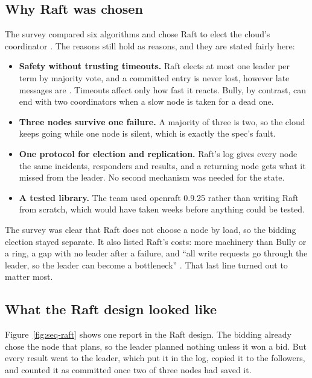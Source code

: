 \subsection{Why Raft was chosen}

The survey compared six algorithms and chose Raft to elect the cloud's coordinator \cite{survey}. The reasons still hold as reasons, and they are stated fairly here:

\begin{itemize}
  \item \textbf{Safety without trusting timeouts.} Raft elects at most one leader per term by majority vote, and a committed entry is never lost, however late messages are \cite{raft}. Timeouts affect only how fast it reacts. Bully, by contrast, can end with two coordinators when a slow node is taken for a dead one.
  \item \textbf{Three nodes survive one failure.} A majority of three is two, so the cloud keeps going while one node is silent, which is exactly the spec's fault.
  \item \textbf{One protocol for election and replication.} Raft's log gives every node the same incidents, responders and results, and a returning node gets what it missed from the leader. No second mechanism was needed for the state.
  \item \textbf{A tested library.} The team used openraft 0.9.25 \cite{openraft} rather than writing Raft from scratch, which would have taken weeks before anything could be tested.
\end{itemize}

The survey was clear that Raft does not choose a node by load, so the bidding election stayed separate. It also listed Raft's costs: more machinery than Bully or a ring, a gap with no leader after a failure, and ``all write requests go through the leader, so the leader can become a bottleneck'' \cite{survey}. That last line turned out to matter most.

\subsection{What the Raft design looked like}

Figure~\ref{fig:seq-raft} shows one report in the Raft design. The bidding already chose the node that plans, so the leader planned nothing unless it won a bid. But every result went to the leader, which put it in the log, copied it to the followers, and counted it as committed once two of three nodes had saved it.

